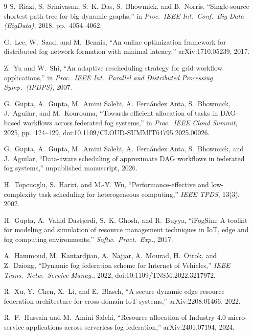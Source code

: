 \documentclass[conference]{IEEEtran}
\theoremstyle{remark}
\begin{document}
\begin{thebibliography}{9}
S.~Riazi, S.~Srinivasan, S.~K. Das, S.~Bhowmick, and B.~Norris,
``Single-source shortest path tree for big dynamic graphs,'' in
\emph{Proc.\ IEEE Int.\ Conf.\ Big Data (BigData)}, 2018, pp.\ 4054--4062.

G.~Lee, W.~Saad, and M.~Bennis, ``An online optimization framework for
distributed fog network formation with minimal latency,''
arXiv:1710.05239, 2017.

Z.~Yu and W.~Shi, ``An adaptive rescheduling strategy for grid workflow
applications,'' in \emph{Proc.\ IEEE Int.\ Parallel and Distributed
Processing Symp.\ (IPDPS)}, 2007.

G.~Gupta, A.~Gupta, M.~Amini Salehi, A.~Fern\'andez Anta, S.~Bhowmick,
J.~Aguilar, and M.~Kourouma, ``Towards efficient allocation of tasks in
DAG-based workflows across federated fog systems,'' in \emph{Proc.\ IEEE
Cloud Summit}, 2025, pp.\ 124--129,
doi:10.1109/CLOUD-SUMMIT64795.2025.00026.

G.~Gupta, A.~Gupta, M.~Amini Salehi, A.~Fern\'andez Anta, S.~Bhowmick, and
J.~Aguilar, ``Data-aware scheduling of approximate DAG workflows in
federated fog systems,'' unpublished manuscript, 2026.

H.~Topcuoglu, S.~Hariri, and M.-Y. Wu, ``Performance-effective and
low-complexity task scheduling for heterogeneous computing,'' \emph{IEEE
TPDS}, 13(3), 2002.

H.~Gupta, A.~Vahid Dastjerdi, S.~K. Ghosh, and R.~Buyya, ``iFogSim: A toolkit
for modeling and simulation of resource management techniques in IoT, edge
and fog computing environments,'' \emph{Softw.\ Pract.\ Exp.}, 2017.

A.~Hammoud, M.~Kantardjian, A.~Najjar, A.~Mourad, H.~Otrok, and
Z.~Dziong, ``Dynamic fog federation scheme for Internet of Vehicles,''
\emph{IEEE Trans.\ Netw.\ Service Manag.}, 2022,
doi:10.1109/TNSM.2022.3217972.

R.~Xu, Y.~Chen, X.~Li, and E.~Blasch, ``A secure dynamic edge resource
federation architecture for cross-domain IoT systems,''
arXiv:2208.01466, 2022.

R.~F.~Hussain and M.~Amini Salehi, ``Resource allocation of Industry 4.0
micro-service applications across serverless fog federation,''
arXiv:2401.07194, 2024.


\end{thebibliography}
\end{document}
